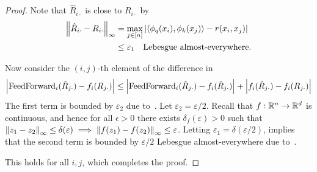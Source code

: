 \begin{proof}
    Note that $\hat{R}_{i\cdot}$ is close to $R_{i\cdot}$ by~
    \begin{equation}\label{eq:approx_proof_R_approx}
        \begin{split}
            \left\lVert\hat{R}_{i\cdot} - R_{i\cdot}\right\rVert_{\infty} &= \max_{j \in [n]} \left\lvert\left \langle \phi_q(x_i), \phi_k(x_j) \right\rangle - r(x_i, x_j)\right\rvert \\
            &\leq \varepsilon_1 \quad \text{Lebesgue almost-everywhere}.
        \end{split}
    \end{equation}

    Now consider the $(i,j)$-th element of the difference in~
    \begin{equation*}
        \left\lvert\mathrm{FeedForward}_i(\hat{R}_{j\cdot}) - f_i(R_{j\cdot})\right\rvert \leq \left\lvert\mathrm{FeedForward}_i(\hat{R}_{j\cdot}) - f_i(\hat{R}_{j\cdot})\right\rvert + \left\lvert f_i(\hat{R}_{j\cdot}) - f_i(R_{j\cdot})\right\rvert
    \end{equation*}
    The first term is bounded by $\varepsilon_2$ due to~. Let $\varepsilon_2 = \varepsilon / 2$. Recall that $f: \mathbb{R}^n \to \mathbb{R}^d$ is continuous, and hence for all $\epsilon > 0$ there exists $\delta_f(\varepsilon) > 0$ such that $\left\lVert z_1 - z_2\right\rVert_{\infty} \leq \delta(\varepsilon) \implies \left\lVert f(z_1) - f(z_2)\right\rVert_{\infty} \leq \varepsilon$. Letting $\varepsilon_1 = \delta(\varepsilon / 2)$, implies that the second term is bounded by $\varepsilon / 2$ Lebesgue almost-everywhere due to~.

    This holds for all $i, j$, which completes the proof.

\end{proof}
